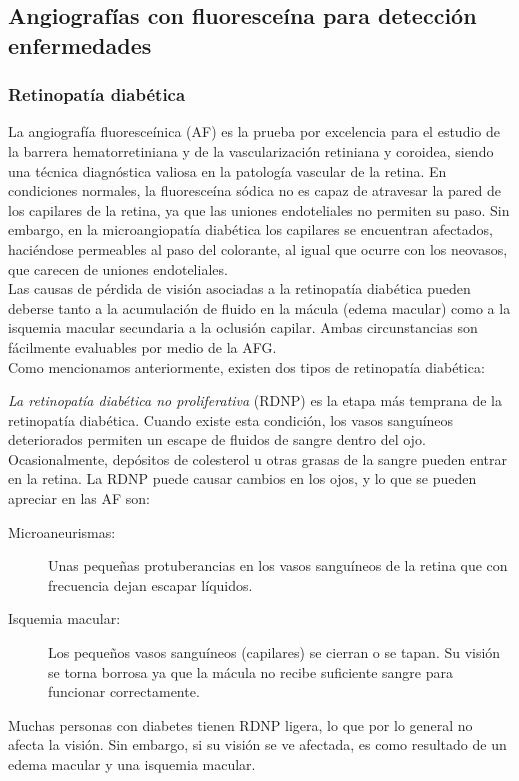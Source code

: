 






\subsection{Angiograf\'ias con fluoresce\'ina para detecci\'on enfermedades }


\subsubsection{Retinopat\'ia diab\'etica}

La angiograf\'ia fluoresce\'inica (AF) es la prueba por excelencia para el estudio de la barrera hematorretiniana y de la vascularizaci\'on retiniana y coroidea, siendo una técnica diagnóstica valiosa en la patología vascular de la retina.
En condiciones normales, la fluoresceína sódica no es capaz de atravesar la pared de los capilares de la retina, ya que las uniones endoteliales no permiten su paso. Sin embargo, en la microangiopatía diabética los capilares se encuentran afectados, haciéndose permeables al paso del colorante, al igual que ocurre con los neovasos, que carecen de uniones endoteliales.
\\
Las causas de pérdida de visión asociadas a la retinopatía diabética pueden deberse tanto a la acumulación de fluido en la mácula (edema macular) como a la isquemia macular secundaria a la oclusión capilar. Ambas circunstancias son fácilmente evaluables por medio de la AFG.
\\
Como mencionamos anteriormente, existen dos tipos de retinopatía diabética:

\textit{La retinopatía diabética no proliferativa} (RDNP) es la etapa más temprana de la retinopatía diabética. Cuando existe esta condición, los vasos sanguíneos deteriorados permiten un escape de fluidos de sangre dentro del ojo. Ocasionalmente, depósitos de colesterol u otras grasas de la sangre pueden entrar en la retina.
La RDNP puede causar cambios en los ojos, y lo que se pueden apreciar en las AF son:
\begin{description}
    \item[Microaneurismas:] Unas pequeñas protuberancias en los vasos sanguíneos de la retina que con frecuencia dejan escapar líquidos.
    \item[Isquemia macular:] Los pequeños vasos sanguíneos (capilares) se cierran o se tapan. Su visión se torna borrosa ya que la mácula no recibe suficiente sangre para funcionar correctamente.
\end{description}
Muchas personas con diabetes tienen RDNP ligera, lo que por lo general no afecta la visión. Sin embargo, si su visión se ve afectada, es como resultado de un edema macular y una isquemia macular.


